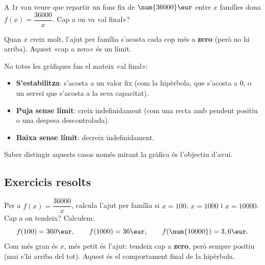 \begin{exemple}
A 1r vau veure que repartir un fons fix de $\num{36000}\eur$ entre $x$ famílies dona
$f(x)=\dfrac{\num{36000}}{x}$. Cap a on va «al final»?

\begin{center}

\end{center}

\noindent Quan $x$ creix molt, l'ajut per família s'acosta cada cop més a \textbf{zero}
(però no hi arriba). Aquest «cap a zero» és un límit.
\end{exemple}

\begin{exemple}
No totes les gràfiques fan el mateix «al final»:
\begin{itemize}[leftmargin=1.4em, itemsep=2pt]
  \item \textbf{S'estabilitza}: s'acosta a un valor fix (com la hipèrbola, que s'acosta
        a $0$, o un servei que s'acosta a la seva capacitat).
  \item \textbf{Puja sense límit}: creix indefinidament (com una recta amb pendent
        positiu o una despesa descontrolada).
  \item \textbf{Baixa sense límit}: decreix indefinidament.
\end{itemize}
Saber distingir aquests casos només mirant la gràfica és l'objectiu d'avui.
\end{exemple}

\subsection{Exercicis resolts}

\begin{exresolt}
Per a $f(x)=\dfrac{\num{36000}}{x}$, calcula l'ajut per família si $x=100$, $x=1000$
i $x=\num{10000}$. Cap a on tendeix?
\solucio
Calculem:
\[
f(100)=360\eur,\qquad f(1000)=36\eur,\qquad f(\num{10000})=3,6\eur.
\]
Com més gran és $x$, més petit és l'ajut: tendeix cap a \textbf{zero}, però sempre
positiu (mai s'hi arriba del tot). Aquest és el comportament final de la hipèrbola.
\end{exresolt}

